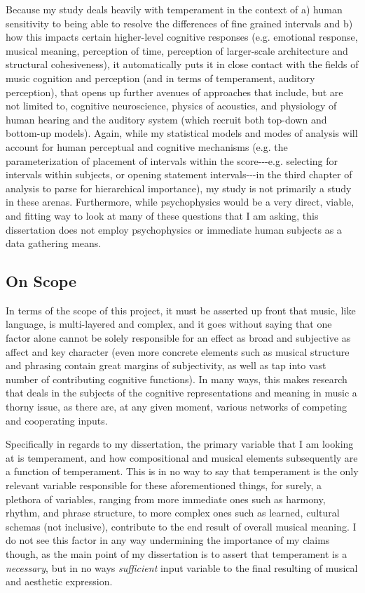 Because my study deals heavily with temperament in the context of a)
human sensitivity to being able to resolve the differences of fine
grained intervals and b) how this impacts certain higher-level cognitive
responses (e.g. emotional response, musical meaning, perception of time,
perception of larger-scale architecture and structural cohesiveness), it
automatically puts it in close contact with the fields of music
cognition and perception (and in terms of temperament, auditory
perception), that opens up further avenues of approaches that include,
but are not limited to, cognitive neuroscience, physics of acoustics,
and physiology of human hearing and the auditory system (which recruit
both top-down and bottom-up models). Again, while my statistical models
and modes of analysis will account for human perceptual and cognitive
mechanisms (e.g. the parameterization of placement of intervals within
the score-\/-\/-e.g. selecting for intervals within subjects, or opening
statement intervals-\/-\/-in the third chapter of analysis to parse for
hierarchical importance), my study is not primarily a study in these
arenas. Furthermore, while psychophysics would be a very direct, viable,
and fitting way to look at many of these questions that I am asking,
this dissertation does not employ psychophysics or immediate human
subjects as a data gathering means.

\subsection{On Scope}\label{on-scope}

In terms of the scope of this project, it must be asserted up front that
music, like language, is multi-layered and complex, and it goes without
saying that one factor alone cannot be solely responsible for an effect
as broad and subjective as affect and key character (even more concrete
elements such as musical structure and phrasing contain great margins of
subjectivity, as well as tap into vast number of contributing cognitive
functions). In many ways, this makes research that deals in the subjects
of the cognitive representations and meaning in music a thorny issue, as
there are, at any given moment, various networks of competing and
cooperating inputs.

Specifically in regards to my dissertation, the primary variable that I
am looking at is temperament, and how compositional and musical elements
subsequently are a function of temperament. This is in no way to say
that temperament is the only relevant variable responsible for these
aforementioned things, for surely, a plethora of variables, ranging from
more immediate ones such as harmony, rhythm, and phrase structure, to
more complex ones such as learned, cultural schemas (not inclusive),
contribute to the end result of overall musical meaning. I do not see
this factor in any way undermining the importance of my claims though,
as the main point of my dissertation is to assert that temperament is a
\emph{necessary}, but in no ways \emph{sufficient} input variable to the
final resulting of musical and aesthetic expression.


    
    
    
